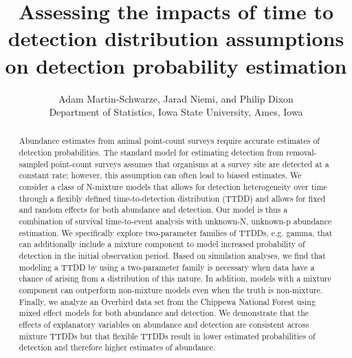 \documentclass[12pt]{article}
\title{Assessing the impacts of time to detection distribution assumptions on detection probability estimation}
\author{Adam Martin-Schwarze, Jarad Niemi, and Philip Dixon\\
Department of Statistics, Iowa State University, Ames, Iowa}
\begin{document}
\maketitle
\newpage


\begin{abstract}

Abundance estimates from animal point-count surveys require accurate estimates of detection probabilities.  
The standard model for estimating detection from removal-sampled point-count surveys assumes that organisms at a survey site are detected at a constant rate; however, this assumption can often lead to biased estimates.  
We consider a class of N-mixture models that allows for detection heterogeneity over time through a flexibly defined time-to-detection distribution (TTDD) and allows for fixed and random effects for both abundance and detection.
Our model is thus a combination of survival time-to-event analysis with unknown-N, unknown-p abundance estimation.  
We specifically explore two-parameter families of TTDDs, e.g. gamma, that can additionally include a mixture component to model increased probability of detection in the initial observation period.
Based on simulation analyses, we find that modeling a TTDD by using a two-parameter family is necessary when data have a chance of arising from a distribution of this nature.
In addition, models with a mixture component can outperform non-mixture models even when the truth is non-mixture.  
Finally, we analyze an Overbird data set from the Chippewa National Forest using mixed effect models for both abundance and detection.
We demonstrate that the effects of explanatory variables on abundance and detection are consistent across mixture TTDDs but that flexible TTDDs result in lower estimated probabilities of detection and therefore higher estimates of abundance. 

\end{abstract}
\end{document}
